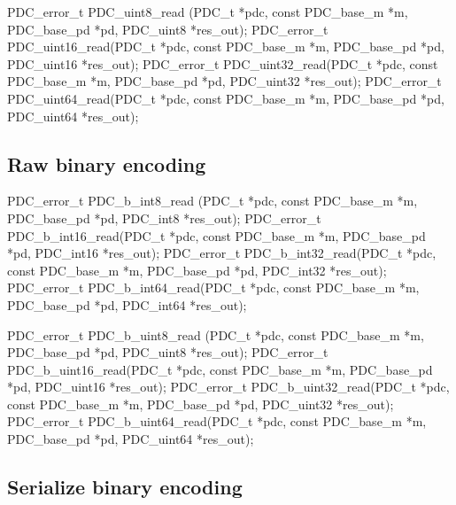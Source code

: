 \begin{tinycodeaux}{\leftmargin=0in}
PDC_error_t PDC_uint8_read (PDC_t *pdc, const PDC_base_m *m,
			    PDC_base_pd *pd, PDC_uint8 *res_out);
PDC_error_t PDC_uint16_read(PDC_t *pdc, const PDC_base_m *m,
			    PDC_base_pd *pd, PDC_uint16 *res_out);
PDC_error_t PDC_uint32_read(PDC_t *pdc, const PDC_base_m *m,
			    PDC_base_pd *pd, PDC_uint32 *res_out);
PDC_error_t PDC_uint64_read(PDC_t *pdc, const PDC_base_m *m,
			    PDC_base_pd *pd, PDC_uint64 *res_out);
\end{tinycodeaux}

\subsection{Raw binary encoding}

\bBegin{}
\bEnd{}

\begin{tinycodeaux}{\leftmargin=0in}
\codeallowbreaks
PDC_error_t PDC_b_int8_read (PDC_t *pdc, const PDC_base_m *m,
			     PDC_base_pd *pd, PDC_int8 *res_out);
PDC_error_t PDC_b_int16_read(PDC_t *pdc, const PDC_base_m *m,
			     PDC_base_pd *pd, PDC_int16 *res_out);
PDC_error_t PDC_b_int32_read(PDC_t *pdc, const PDC_base_m *m,
			     PDC_base_pd *pd, PDC_int32 *res_out);
PDC_error_t PDC_b_int64_read(PDC_t *pdc, const PDC_base_m *m,
			     PDC_base_pd *pd, PDC_int64 *res_out);

PDC_error_t PDC_b_uint8_read (PDC_t *pdc, const PDC_base_m *m,
			      PDC_base_pd *pd, PDC_uint8 *res_out);
PDC_error_t PDC_b_uint16_read(PDC_t *pdc, const PDC_base_m *m,
			      PDC_base_pd *pd, PDC_uint16 *res_out);
PDC_error_t PDC_b_uint32_read(PDC_t *pdc, const PDC_base_m *m,
			      PDC_base_pd *pd, PDC_uint32 *res_out);
PDC_error_t PDC_b_uint64_read(PDC_t *pdc, const PDC_base_m *m,
			      PDC_base_pd *pd, PDC_uint64 *res_out);
\end{tinycodeaux}

\subsection{Serialize binary encoding}

\sbBegin{}
\bEnd{}

